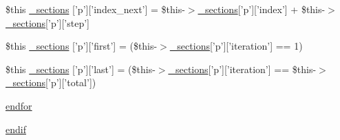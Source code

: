 \begin{DoxyCompactItemize}
\item 
\$this \hyperlink{_06_06131_05_06_06131447552_05elementindex_8tpl_8php_a12e484db2ccd39a02dc1d3629356880e}{\-\_\-sections} \mbox{[}'p'\mbox{]}\mbox{[}'index\-\_\-next'\mbox{]} = \$this-\/$>$\hyperlink{_06_06127_05_06_0612781687_05pkgelementindex_8tpl_8php_a9e3d26b39edfe29c3f29b8035ef33828}{\-\_\-sections}\mbox{[}'p'\mbox{]}\mbox{[}'index'\mbox{]} + \$this-\/$>$\hyperlink{_06_06127_05_06_0612781687_05pkgelementindex_8tpl_8php_a9e3d26b39edfe29c3f29b8035ef33828}{\-\_\-sections}\mbox{[}'p'\mbox{]}\mbox{[}'step'\mbox{]}
\item 
\$this \hyperlink{_06_06131_05_06_06131447552_05elementindex_8tpl_8php_a078d9529f4dbce53af052f6d965d9b4a}{\-\_\-sections} \mbox{[}'p'\mbox{]}\mbox{[}'first'\mbox{]} = (\$this-\/$>$\hyperlink{_06_06127_05_06_0612781687_05pkgelementindex_8tpl_8php_a9e3d26b39edfe29c3f29b8035ef33828}{\-\_\-sections}\mbox{[}'p'\mbox{]}\mbox{[}'iteration'\mbox{]} == 1)
\item 
\$this \hyperlink{_06_06131_05_06_06131447552_05elementindex_8tpl_8php_a9e3d26b39edfe29c3f29b8035ef33828}{\-\_\-sections} \mbox{[}'p'\mbox{]}\mbox{[}'last'\mbox{]} = (\$this-\/$>$\hyperlink{_06_06127_05_06_0612781687_05pkgelementindex_8tpl_8php_a9e3d26b39edfe29c3f29b8035ef33828}{\-\_\-sections}\mbox{[}'p'\mbox{]}\mbox{[}'iteration'\mbox{]} == \$this-\/$>$\hyperlink{_06_06127_05_06_0612781687_05pkgelementindex_8tpl_8php_a9e3d26b39edfe29c3f29b8035ef33828}{\-\_\-sections}\mbox{[}'p'\mbox{]}\mbox{[}'total'\mbox{]})
\item 
\hyperlink{_06_06131_05_06_06131447552_05elementindex_8tpl_8php_ae8fdc27183f296411bac00ed522ee1ac}{endfor}
\item 
\hyperlink{_06_06131_05_06_06131447552_05elementindex_8tpl_8php_a82cd33ca97ff99f2fcc5e9c81d65251b}{endif}
\end{DoxyCompactItemize}


